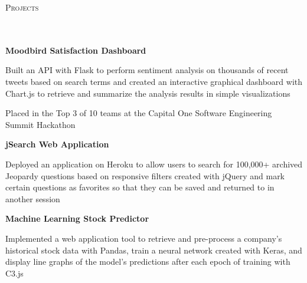 \documentclass{article}
\newcommand{\header}[1]{{
\hspace*{-15pt}\vspace*{6pt} \large \scshape{#1}} \vspace*{-6pt} 
\lineunder
}
\newcommand{\lineunder}{
\vspace*{-8pt} \\ \hspace*{-18pt} 
\hrulefill \\
}
\newcommand{\project}[4]{{
\vspace*{2pt}%
\textbf{#1} #2 \hfill #3\\ #4 \vspace*{2pt}}
}
\renewcommand{\labelitemii}{
$\vcenter{\hbox{\tiny$\bullet$}}$\hspace*{-3pt}
}
\newenvironment{bullet-list-minor}{
\begin{list}{\labelitemii}{\setlength\leftmargin{15pt} 
\topsep 0pt \itemsep -2pt}}{\vspace*{4pt}\end{list}
}
\begin{document}
\medskip

\vspace*{4pt}%
\header{Projects}
    \vspace{4pt}
    \project{Moodbird Satisfaction Dashboard}{}{}{}
	\begin{bullet-list-minor} 
	\item Built an API with Flask to perform sentiment analysis on thousands of recent tweets based on search terms and created an interactive graphical dashboard with Chart.js to retrieve and summarize the analysis results in simple visualizations
	\item Placed in the Top 3 of 10 teams at the Capital One Software Engineering Summit Hackathon
    \end{bullet-list-minor}
    \smallskip
    \project{jSearch Web Application}{}{}{}
	\begin{bullet-list-minor}
	\item Deployed an application on Heroku to allow users to search for 100,000+ archived Jeopardy questions based on responsive filters created with jQuery and mark certain questions as favorites so that they can be saved and returned to in another session
    \end{bullet-list-minor}
    \smallskip    
    \project{Machine Learning Stock Predictor}{}{}{}
	\begin{bullet-list-minor}
	\item Implemented a web application tool to retrieve and pre-process a company's historical stock data with Pandas, train a neural network created with Keras, and display line graphs of the model's predictions after each epoch of training with C3.js
    \end{bullet-list-minor}
\end{document}
